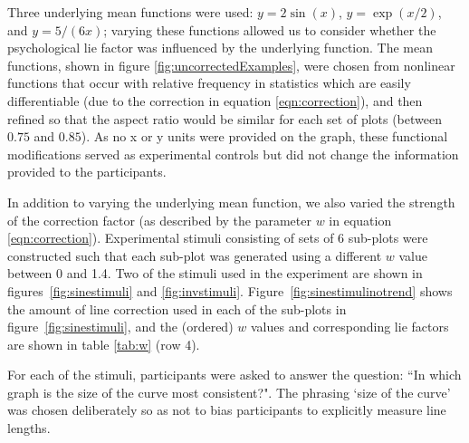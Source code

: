 \documentclass[11pt]{isuthesis}\usepackage[]{graphicx}\usepackage[]{color}
\begin{document}
Three underlying mean functions were used: $y=2\sin(x)$, $y=\exp(x/2)$, and $y=5/(6x)$; varying these functions allowed us to consider whether the psychological lie factor was influenced by the underlying function. The mean functions, shown in figure \ref{fig:uncorrectedExamples}, were chosen from nonlinear functions that occur with relative frequency in statistics which are easily differentiable (due to the correction in equation \ref{eqn:correction}), and then refined so that the aspect ratio would be similar for each set of plots (between $0.75$ and $0.85$). As no x or y units were provided on the graph, these functional modifications served as experimental controls but did not change the information provided to the participants. 


In addition to varying the underlying mean function, we also varied the strength of the correction factor (as described by the parameter $w$ in equation \ref{eqn:correction}). Experimental stimuli consisting of sets of 6 sub-plots were constructed such that each sub-plot was generated using a different $w$ value between 0 and 1.4. Two of the stimuli used in the experiment are shown in figures~\ref{fig:sinestimuli} and \ref{fig:invstimuli}. Figure~\ref{fig:sinestimulinotrend} shows the amount of line correction used in each of the sub-plots in figure~\ref{fig:sinestimuli}, and the (ordered) $w$ values and corresponding lie factors are shown in table \ref{tab:w} (row 4).

For each of the stimuli, participants were asked to answer the question: ``In which graph is the size of the curve most consistent?". The phrasing `size of the curve' was chosen deliberately so as not to bias participants to explicitly measure line lengths. 
\end{document}

